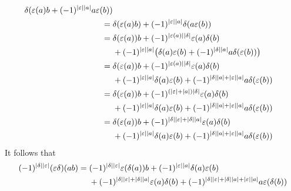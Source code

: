 \documentclass[a4paper,10pt,headings=standardclasses]{scrartcl}
\begin{document}
\begin{enumerate}
\begin{align*}
      \delta( \varepsilon(a) b + (-1)^{\lvert\varepsilon\rvert \lvert a\rvert} a \varepsilon(b) )
      \\
      ={}&
        \delta( \varepsilon(a) b )
      + (-1)^{\lvert\varepsilon\rvert \lvert a\rvert}
        \delta( a \varepsilon(b) )
      \\
      ={}&
        \delta(\varepsilon(a)) b
      + (-1)^{\lvert\varepsilon(a)\rvert \lvert\delta\rvert}
        \varepsilon(a) \delta(b)
      \\
      {}&
      + (-1)^{\lvert\varepsilon\rvert \lvert a\rvert}
        \bigl(
            \delta(a)\varepsilon(b)
          + (-1)^{\lvert\delta\rvert \lvert a\rvert} a \delta(\varepsilon(b))
        \bigr)
      \\
      ={}&
        \delta(\varepsilon(a)) b
      + (-1)^{\lvert\varepsilon(a)\rvert \lvert\delta\rvert}
        \varepsilon(a) \delta(b)
      \\
      {}&
      + (-1)^{\lvert\varepsilon\rvert \lvert a\rvert} \delta(a)\varepsilon(b)
      + (-1)^{\lvert\delta\rvert \lvert a\rvert + \lvert\varepsilon\rvert \lvert a\rvert}
        a \delta(\varepsilon(b))
      \\
      ={}&
        \delta(\varepsilon(a)) b
      + (-1)^{(\lvert\varepsilon\rvert + \lvert a\rvert) \lvert\delta\rvert}
        \varepsilon(a) \delta(b)
      \\
      {}&
      + (-1)^{\lvert\varepsilon\rvert \lvert a\rvert}
        \delta(a)\varepsilon(b)
      + (-1)^{\lvert\delta\rvert \lvert a\rvert + \lvert\varepsilon\rvert \lvert a\rvert}
        a \delta(\varepsilon(b))
      \\
      ={}&
        \delta(\varepsilon(a)) b
      + (-1)^{\lvert\delta\rvert \lvert\varepsilon\rvert + \lvert\delta\rvert \lvert a\rvert}
        \varepsilon(a) \delta(b)
      \\
      {}&
      + (-1)^{\lvert\varepsilon\rvert \lvert a\rvert}
        \delta(a) \varepsilon(b)
      + (-1)^{\lvert\delta\rvert \lvert a\rvert + \lvert\varepsilon\rvert \lvert a\rvert}
        a \delta(\varepsilon(b))
    \end{align*}
    \endgroup
    It follows that
    \begin{align*}
      (-1)^{\hdeg{\delta} \hdeg{\varepsilon}}
      (\varepsilon \delta)(ab)
      ={}&
        (-1)^{\hdeg{\delta} \hdeg{\varepsilon}}
        \varepsilon(\delta(a)) b
      + (-1)^{\hdeg{\varepsilon} \hdeg{a}}
        \delta(a) \varepsilon(b)
      \\
      {}&
      + (-1)^{\hdeg{\delta} \hdeg{\varepsilon} + \hdeg{\delta} \hdeg{a}}
        \varepsilon(a) \delta(b)
      + (-1)^{\hdeg{\delta} \hdeg{\varepsilon}  + \hdeg{\delta} \hdeg{a} + \hdeg{\varepsilon} \hdeg{a}}
        a \varepsilon(\delta(b))

\end{align*}
\end{enumerate}
\end{document}
